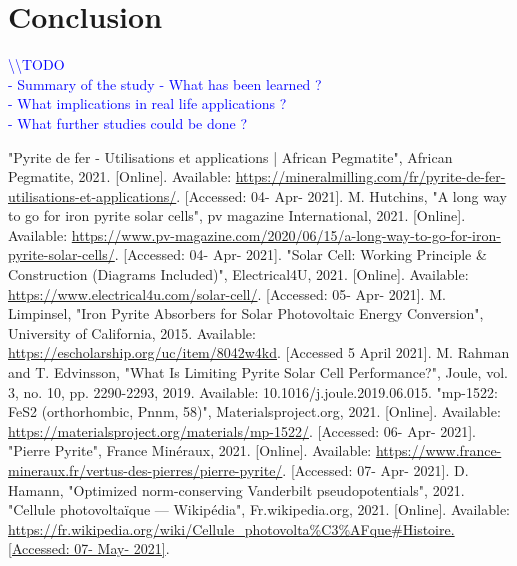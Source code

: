 \documentclass[11pt,a4paper]{article}
\begin{document}
\section{Conclusion}
\textcolor{blue}{
\textbackslash\textbackslash TODO\\
- Summary of the study
- What has been learned ? \\
- What implications in real life applications ?\\
- What further studies could be done ?}
\newpage
\begin{thebibliography}{00}
 "Pyrite de fer - Utilisations et applications | African Pegmatite", African Pegmatite, 2021. [Online]. Available: \url{https://mineralmilling.com/fr/pyrite-de-fer-utilisations-et-applications/}. [Accessed: 04- Apr- 2021].
 M. Hutchins, "A long way to go for iron pyrite solar cells", pv magazine International, 2021. [Online]. Available: \url{https://www.pv-magazine.com/2020/06/15/a-long-way-to-go-for-iron-pyrite-solar-cells/}. [Accessed: 04- Apr- 2021].
 "Solar Cell: Working Principle \& Construction (Diagrams Included)", Electrical4U, 2021. [Online]. Available: \url{https://www.electrical4u.com/solar-cell/}. [Accessed: 05- Apr- 2021].
 M. Limpinsel, "Iron Pyrite Absorbers for Solar Photovoltaic Energy Conversion", University of California, 2015. Available: \url{https://escholarship.org/uc/item/8042w4kd}. [Accessed 5 April 2021].
 M. Rahman and T. Edvinsson, "What Is Limiting Pyrite Solar Cell Performance?", Joule, vol. 3, no. 10, pp. 2290-2293, 2019. Available: 10.1016/j.joule.2019.06.015.
 "mp-1522: FeS2 (orthorhombic, Pnnm, 58)", Materialsproject.org, 2021. [Online]. Available: \url{https://materialsproject.org/materials/mp-1522/}. [Accessed: 06- Apr- 2021].
"Pierre Pyrite", France Minéraux, 2021. [Online]. Available: \url{https://www.france-mineraux.fr/vertus-des-pierres/pierre-pyrite/}. [Accessed: 07- Apr- 2021].
 D. Hamann, "Optimized norm-conserving Vanderbilt pseudopotentials", 2021.
 "Cellule photovoltaïque — Wikipédia", Fr.wikipedia.org, 2021. [Online]. Available: \url{https://fr.wikipedia.org/wiki/Cellule\_photovolta%C3%AFque#Histoire. [Accessed: 07- May- 2021]}.
\end{thebibliography}
\newpage
\appendix
\end{document}
